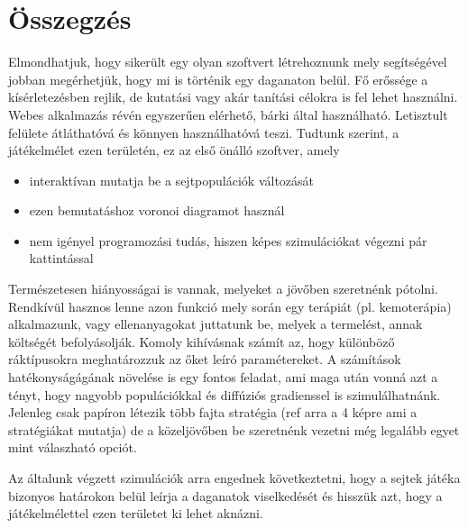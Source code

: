 \chapter{Összegzés}

Elmondhatjuk, hogy sikerült egy olyan szoftvert létrehoznunk mely segítségével jobban megérhetjük, hogy mi is történik egy daganaton belül. Fő erőssége a kísérletezésben rejlik, de kutatási vagy akár tanítási célokra is fel lehet használni. Webes alkalmazás révén egyszerűen elérhető, bárki által használható. Letisztult felülete átláthatóvá és könnyen használhatóvá teszi. Tudtunk szerint, a játékelmélet ezen területén, ez az első önálló szoftver, amely 
\begin{itemize}[noitemsep]
	\item interaktívan mutatja be a sejtpopulációk változását
	\item ezen bemutatáshoz voronoi diagramot használ
	\item nem igényel programozási tudás, hiszen képes szimulációkat végezni pár kattintással
\end{itemize}

Természetesen hiányosságai is vannak, melyeket a jövőben szeretnénk pótolni. Rendkívül hasznos lenne azon funkció mely során egy terápiát (pl. kemoterápia) alkalmazunk, vagy ellenanyagokat juttatunk be, melyek a termelést, annak költségét befolyásolják. Komoly kihívásnak számít az, hogy különböző ráktípusokra meghatározzuk az őket leíró paramétereket. A számítások hatékonyságágának növelése is egy fontos feladat, ami maga után vonná azt a tényt, hogy nagyobb populációkkal és diffúziós gradienssel is szimulálhatnánk. 
Jelenleg csak papíron létezik több fajta stratégia (ref arra a 4 képre ami a stratégiákat mutatja) de a közeljövőben be szeretnénk vezetni még legalább egyet mint válaszható opciót.

Az általunk végzett szimulációk arra engednek következtetni, hogy a sejtek játéka bizonyos határokon belül leírja a daganatok viselkedését és hisszük azt, hogy a játékelmélettel ezen területet ki lehet aknázni.